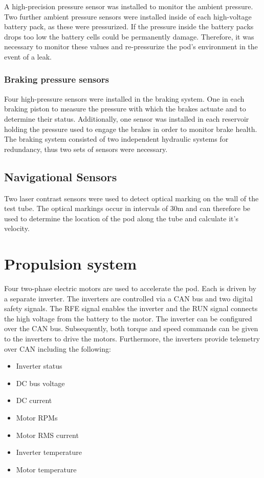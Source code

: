 A high-precision pressure sensor was installed to monitor the ambient pressure. Two further ambient pressure sensors were installed inside of each high-voltage battery pack, as these were pressurized. If the pressure inside the battery packs drops too low the battery cells could be permanently damage. Therefore, it was necessary to monitor these values and re-pressurize the pod's environment in the event of a leak.

\subsubsection{Braking pressure sensors}

Four high-pressure sensors were installed in the braking system. One in each braking piston to measure the pressure with which the brakes actuate and to determine their status. Additionally, one sensor was installed in each reservoir holding the pressure used to engage the brakes in order to monitor brake health. The braking system consisted of two independent hydraulic systems for redundancy, thus two sets of sensors were necessary.

\subsection{Navigational Sensors}

Two laser contrast sensors were used to detect optical marking on the wall of the test tube. The optical markings occur in intervals of 30m and can therefore be used to determine the location of the pod along the tube and calculate it's velocity.

\section{Propulsion system}

Four two-phase electric motors are used to accelerate the pod. Each is driven by a separate inverter. The inverters are controlled via a CAN bus and two digital safety signals. The RFE signal enables the inverter and the RUN signal connects the high voltage from the battery to the motor. The inverter can be configured over the CAN bus. Subsequently, both torque and speed commands can be given to the inverters to drive the motors. Furthermore, the inverters provide telemetry over CAN including the following:

\begin{itemize}
    \item Inverter status
    \item DC bus voltage
    \item DC current
    \item Motor RPMs
    \item Motor RMS current
    \item Inverter temperature
    \item Motor temperature
\end{itemize}

